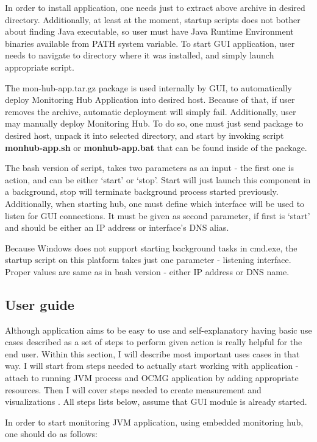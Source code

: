 In order to install application, one needs just to extract above archive in desired directory. Additionally, at least at the moment, startup scripts does not bother about finding Java executable, so user must have Java Runtime Environment binaries available from PATH system variable. To start GUI application, user needs to navigate to directory where it was installed, and simply launch appropriate script.

The mon-hub-app.tar.gz package is used internally by GUI, to automatically deploy Monitoring Hub Application into desired host. Because of that, if user removes the archive, automatic deployment will simply fail. Additionally, user may manually deploy Monitoring Hub. To do so, one must just send package to desired host, unpack it into selected directory, and start by invoking script {\bf monhub-app.sh} or {\bf monhub-app.bat} that can be found inside of the package. 

The bash version of script, takes two parameters as an input - the first one is action, and can be either \lq{}start\rq{} or \lq{}stop\rq{}. Start will just launch this component in a background, stop will terminate background process started previously. Additionally, when starting hub, one must define which interface will be used to listen for GUI connections. It must be given as second parameter, if first is \lq{}start\rq{} and should be either an IP address or interface\rq{}s DNS alias. 

Because Windows does not support starting background tasks in cmd.exe, the startup script on this platform takes just one parameter - listening interface. Proper values are same as in bash version - either IP address or DNS name.

\subsection{User guide}

Although application aims to be easy to use and self-explanatory having basic use cases described as a set of steps to perform given action is really helpful for the end user. Within this section, I will describe most important uses cases in that way. I will start from steps needed to actually start working with application - attach to running JVM process and OCMG application by adding appropriate resources. Then I will cover steps needed to create measurement and visualizations . All steps lists below, assume that GUI module is already started.

In order to start monitoring JVM application, using embedded monitoring hub, one should do as follows:

